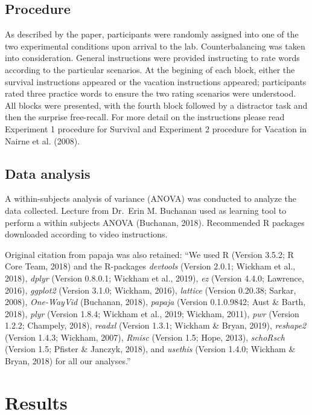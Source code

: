 \documentclass[man]{apa6}
\begin{document}
\hypertarget{procedure}{%
\subsection{Procedure}\label{procedure}}

As described by the paper, participants were randomly assigned into one of the two experimental conditions upon arrival to the lab. Counterbalancing was taken into consideration. General instructions were provided instructing to rate words according to the particular scenarios. At the begining of each block, either the survival instructions appeared or the vacation instructions appeared; participants rated three practice words to ensure the two rating scenarios were understood. All blocks were presented, with the fourth block followed by a distractor task and then the surprise free-recall. For more detail on the instructions please read Experiment 1 procedure for Survival and Experiment 2 procedure for Vacation in Nairne et al. (2008).

\hypertarget{data-analysis}{%
\subsection{Data analysis}\label{data-analysis}}

A within-subjects analysis of variance (ANOVA) was conducted to analyze the data collected. Lecture from Dr.~Erin M. Buchanan used as learning tool to perform a within subjects ANOVA (Buchanan, 2018). Recommended R packages downloaded according to video instructions.

Original citation from papaja was also retained: \enquote{We used R (Version 3.5.2; R Core Team, 2018) and the R-packages \emph{devtools} (Version 2.0.1; Wickham et al., 2018), \emph{dplyr} (Version 0.8.0.1; Wickham et al., 2019), \emph{ez} (Version 4.4.0; Lawrence, 2016), \emph{ggplot2} (Version 3.1.0; Wickham, 2016), \emph{lattice} (Version 0.20.38; Sarkar, 2008), \emph{One-WayVid} (Buchanan, 2018), \emph{papaja} (Version 0.1.0.9842; Aust \& Barth, 2018), \emph{plyr} (Version 1.8.4; Wickham et al., 2019; Wickham, 2011), \emph{pwr} (Version 1.2.2; Champely, 2018), \emph{readxl} (Version 1.3.1; Wickham \& Bryan, 2019), \emph{reshape2} (Version 1.4.3; Wickham, 2007), \emph{Rmisc} (Version 1.5; Hope, 2013), \emph{schoRsch} (Version 1.5; Pfister \& Janczyk, 2018), and \emph{usethis} (Version 1.4.0; Wickham \& Bryan, 2018) for all our analyses.}

\newpage

\hypertarget{results}{%
\section{Results}\label{results}}
\end{document}
